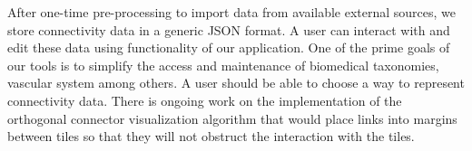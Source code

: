 After one-time pre-processing to import data from available external sources, we store connectivity data in a generic JSON format. A user can interact with and edit these data using functionality of our application. One of the prime goals of our tools is to simplify the access and maintenance of biomedical taxonomies, vascular system among others. A user should be able to choose a way to represent connectivity data. There is ongoing work on the implementation of the orthogonal connector visualization algorithm that would place links into margins between tiles so that they will not obstruct the interaction with the tiles.


